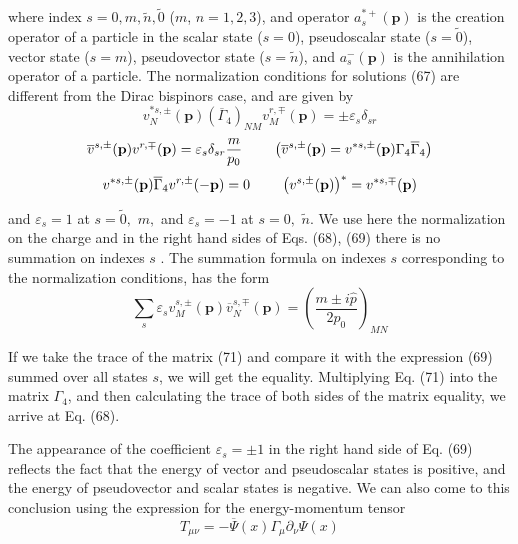 \documentclass[a4paper,12pt]{article}
\begin{document}
where index $s=0,m,\widetilde{n},\widetilde{0}$ ($m$, $n=1,2,3$),
and operator $a_s^{*+}(\mathbf{p})$ is the creation operator of a
particle in the scalar state ($s=0$), pseudoscalar state
($s=\widetilde{0}$), vector state ($s=m$), pseudovector state
($s=\widetilde{n}$), and $a_s^{-}(\mathbf{p })$ is the
annihilation operator of a particle. The normalization conditions
for solutions (67) are different from the Dirac bispinors case,
and are given by
\begin{equation}
v_N^{*s,\pm }(\mathbf{p})\left( \overline{\Gamma }_4\right) _{NM}v_M^{r,\mp
}(\mathbf{p})=\pm \varepsilon _s\delta _{sr}  \label{68}
\end{equation}
\begin{equation}
\overline{v}^{s,\pm }(\mathbf{p})v^{r,\mp
}(\mathbf{p})=\varepsilon _s\delta _{sr}\frac
m{p_0}\hspace{0.3in}\left( \overline{v}^{s,\pm }(\mathbf{p}
)=v^{*s,\pm }(\mathbf{p})\Gamma _4\overline{\Gamma }_4\right)
\label{69}
\end{equation}
\begin{equation}
v^{*s,\pm }(\mathbf{p})\overline{\Gamma }_4v^{r,\pm
}(-\mathbf{p})=0 \hspace{0.3in}\left( v^{s,\pm
}(\mathbf{p})\right) ^{*}=v^{*s,\mp }(\mathbf{p })  \label{70}
\end{equation}

and $\varepsilon _s=1$ at $s=\widetilde{0},$ $m,$ and $\varepsilon
_s=-1$ at $s=0,$ $\widetilde{n}.$ We use here the normalization on
the charge and in the right hand sides of Eqs. (68), (69) there is
no summation on indexes $s$ . The summation formula on indexes $s$
corresponding to the normalization conditions, has the form
\begin{equation}
\sum_s\varepsilon _sv_M^{s,\pm }(\mathbf{p})\overline{v}_N^{s,\mp
}(\mathbf{p })=\left( \frac{m\pm i\widehat{p}}{2p_0}\right) _{MN}
\label{71}
\end{equation}

If we take the trace of the matrix (71) and compare it with the expression
(69) summed over all states $s$, we will get the equality. Multiplying Eq.
(71) into the matrix $\Gamma _4$, and then calculating the trace of both
sides of the matrix equality, we arrive at Eq. (68).

The appearance of the coefficient $\varepsilon _s=\pm 1$ in the right hand
side of Eq. (69) reflects the fact that the energy of vector and
pseudoscalar states is positive, and the energy of pseudovector and scalar
states is negative. We can also come to this conclusion using the expression
for the energy-momentum tensor
\begin{equation}
T_{\mu \nu }=-\overline{\Psi }(x)\Gamma _\mu \partial _\nu \Psi (x)
\label{72}
\end{equation}
\end{document}
